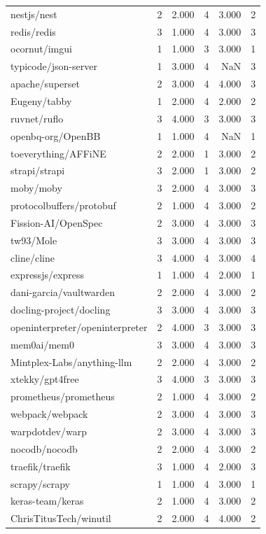 \begin{tabular}{lrrrrr}
nestjs/nest & 2 & 2.000 & 4 & 3.000 & 2 \\
redis/redis & 3 & 1.000 & 4 & 3.000 & 3 \\
ocornut/imgui & 1 & 1.000 & 3 & 3.000 & 1 \\
typicode/json-server & 1 & 3.000 & 4 & NaN & 3 \\
apache/superset & 2 & 3.000 & 4 & 4.000 & 3 \\
Eugeny/tabby & 1 & 2.000 & 4 & 2.000 & 2 \\
ruvnet/ruflo & 3 & 4.000 & 3 & 3.000 & 3 \\
openbq-org/OpenBB & 1 & 1.000 & 4 & NaN & 1 \\
toeverything/AFFiNE & 2 & 2.000 & 1 & 3.000 & 2 \\
strapi/strapi & 3 & 2.000 & 1 & 3.000 & 2 \\
moby/moby & 3 & 2.000 & 4 & 3.000 & 3 \\
protocolbuffers/protobuf & 2 & 1.000 & 4 & 3.000 & 2 \\
Fission-AI/OpenSpec & 2 & 3.000 & 4 & 3.000 & 3 \\
tw93/Mole & 3 & 3.000 & 4 & 3.000 & 3 \\
cline/cline & 3 & 4.000 & 4 & 3.000 & 4 \\
expressjs/express & 1 & 1.000 & 4 & 2.000 & 1 \\
dani-garcia/vaultwarden & 2 & 2.000 & 4 & 3.000 & 2 \\
docling-project/docling & 3 & 3.000 & 4 & 3.000 & 3 \\
openinterpreter/openinterpreter & 2 & 4.000 & 3 & 3.000 & 3 \\
mem0ai/mem0 & 3 & 3.000 & 4 & 3.000 & 3 \\
Mintplex-Labs/anything-llm & 2 & 2.000 & 4 & 3.000 & 2 \\
xtekky/gpt4free & 3 & 4.000 & 3 & 3.000 & 3 \\
prometheus/prometheus & 2 & 1.000 & 4 & 3.000 & 2 \\
webpack/webpack & 2 & 3.000 & 4 & 3.000 & 3 \\
warpdotdev/warp & 2 & 3.000 & 4 & 3.000 & 3 \\
nocodb/nocodb & 2 & 2.000 & 4 & 3.000 & 2 \\
traefik/traefik & 3 & 1.000 & 4 & 2.000 & 3 \\
scrapy/scrapy & 1 & 1.000 & 4 & 3.000 & 1 \\
keras-team/keras & 2 & 1.000 & 4 & 3.000 & 2 \\
ChrisTitusTech/winutil & 2 & 2.000 & 4 & 4.000 & 2 \\

\end{tabular}
